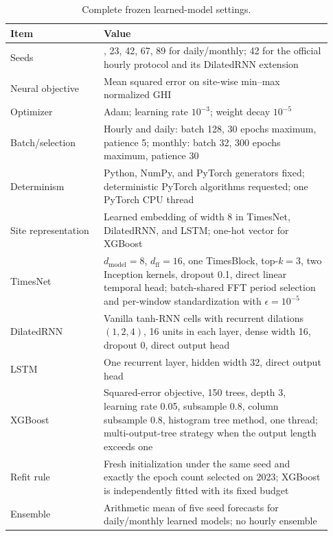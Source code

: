\begin{table}[!t]
\centering
\caption{Complete frozen learned-model settings.}
\label{tab:complete_hyperparameters}
\footnotesize
\setlength{\tabcolsep}{3pt}
\renewcommand{\arraystretch}{1.10}
\begin{tabular}{@{}
  >{\raggedright\arraybackslash}p{0.27\linewidth}
  >{\raggedright\arraybackslash}p{0.66\linewidth}@{}}
\toprule
\textbf{Item} & \textbf{Value} \\
\midrule
Seeds & 11, 23, 42, 67, 89 for daily/monthly; 42 for the official hourly
protocol and its DilatedRNN extension \\
Neural objective & Mean squared error on site-wise min--max normalized GHI \\
Optimizer & Adam; learning rate $10^{-3}$; weight decay $10^{-5}$ \\
Batch/selection & Hourly and daily: batch 128, 30 epochs maximum, patience 5;
monthly: batch 32, 300 epochs maximum, patience 30 \\
Determinism & Python, NumPy, and PyTorch generators fixed; deterministic
PyTorch algorithms requested; one PyTorch CPU thread \\
Site representation & Learned embedding of width 8 in TimesNet, DilatedRNN,
and LSTM; one-hot vector for XGBoost \\
TimesNet & $d_{\mathrm{model}}=8$, $d_{\mathrm{ff}}=16$, one TimesBlock,
top-$k=3$, two Inception kernels, dropout 0.1, direct linear temporal head;
batch-shared FFT period selection and per-window standardization with
$\epsilon=10^{-5}$ \\
DilatedRNN & Vanilla tanh-RNN cells with recurrent dilations $(1,2,4)$,
16 units in each layer, dense width 16, dropout 0, direct output head \\
LSTM & One recurrent layer, hidden width 32, direct output head \\
XGBoost & Squared-error objective, 150 trees, depth 3, learning rate 0.05,
subsample 0.8, column subsample 0.8, histogram tree method, one thread;
multi-output-tree strategy when the output length exceeds one \\
Refit rule & Fresh initialization under the same seed and exactly the epoch
count selected on 2023; XGBoost is independently fitted with its fixed budget \\
Ensemble & Arithmetic mean of five seed forecasts for daily/monthly learned
models; no hourly ensemble \\
\bottomrule
\end{tabular}
\end{table}

